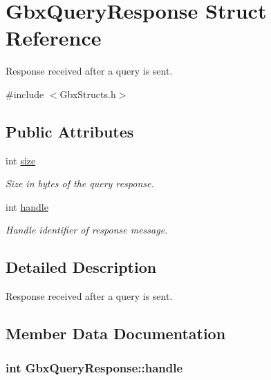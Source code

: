 \hypertarget{structGbxQueryResponse}{\section{Gbx\-Query\-Response Struct Reference}
\label{structGbxQueryResponse}
}


Response received after a query is sent.  




{\ttfamily \#include $<$Gbx\-Structs.\-h$>$}

\subsection*{Public Attributes}
\begin{DoxyCompactItemize}
\item 
int \hyperlink{structGbxQueryResponse_a0633cc01128e5eee2edba3ee503db1c4}{size}
\begin{DoxyCompactList}\small\item\em Size in bytes of the query response. \end{DoxyCompactList}\item 
int \hyperlink{structGbxQueryResponse_a0f13a7b1745dcf1f7e17c0bc3a0acecb}{handle}
\begin{DoxyCompactList}\small\item\em Handle identifier of response message. \end{DoxyCompactList}\end{DoxyCompactItemize}


\subsection{Detailed Description}
Response received after a query is sent. 

\subsection{Member Data Documentation}
\hypertarget{structGbxQueryResponse_a0f13a7b1745dcf1f7e17c0bc3a0acecb}{
\subsubsection[{handle}]{\setlength{\rightskip}{0pt plus 5cm}int Gbx\-Query\-Response\-::handle}}\label{structGbxQueryResponse_a0f13a7b1745dcf1f7e17c0bc3a0acecb}


